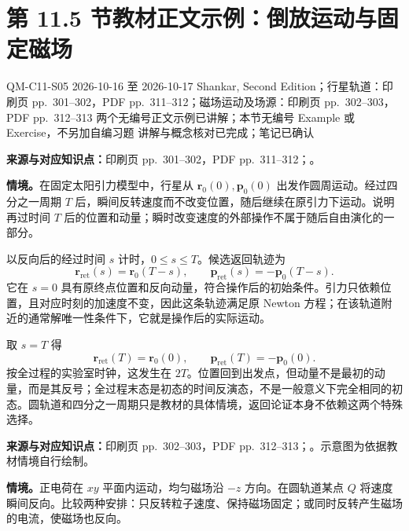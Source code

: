 \section{第 11.5 节教材正文示例：倒放运动与固定磁场}
\label{exercises:QM-C11-S05}
\exercisemeta
  {QM-C11-S05}
  {2026-10-16 至 2026-10-17}
  {Shankar, Second Edition；行星轨道：印刷页 pp.~301--302，PDF pp.~311--312；磁场运动及场源：印刷页 pp.~302--303，PDF pp.~312--313}
  {两个无编号正文示例已讲解；本节无编号 Example 或 Exercise，不另加自编习题}
  {讲解与概念核对已完成；笔记已确认}

\textbf{来源与对应知识点：}印刷页 pp.~301--302，PDF pp.~311--312；。

\textbf{情境。}在固定太阳引力模型中，行星从 $\mathbf r_0(0),\mathbf p_0(0)$ 出发作圆周运动。经过四分之一周期 $T$ 后，瞬间反转速度而不改变位置，随后继续在原引力下运动。说明再过时间 $T$ 后的位置和动量；瞬时改变速度的外部操作不属于随后自由演化的一部分。

\begin{checkedsolution}
以反向后的经过时间 $s$ 计时，$0\le s\le T$。候选返回轨迹为
\begin{equation}
  \mathbf r_{\mathrm{ret}}(s)=\mathbf r_0(T-s),\qquad
  \mathbf p_{\mathrm{ret}}(s)=-\mathbf p_0(T-s).
\end{equation}
它在 $s=0$ 具有原终点位置和反向动量，符合操作后的初始条件。引力只依赖位置，且对应时刻的加速度不变，因此这条轨迹满足原 Newton 方程；在该轨道附近的通常解唯一性条件下，它就是操作后的实际运动。

取 $s=T$ 得
\begin{equation}
  \boxed{\mathbf r_{\mathrm{ret}}(T)=\mathbf r_0(0),\qquad
         \mathbf p_{\mathrm{ret}}(T)=-\mathbf p_0(0)}.
\end{equation}
按全过程的实验室时钟，这发生在 $2T$。位置回到出发点，但动量不是最初的动量，而是其反号；全过程末态是初态的时间反演态，不是一般意义下完全相同的初态。圆轨道和四分之一周期只是教材的具体情境，返回论证本身不依赖这两个特殊选择。
\end{checkedsolution}

\textbf{来源与对应知识点：}印刷页 pp.~302--303，PDF pp.~312--313；。示意图为依据教材情境自行绘制。

\textbf{情境。}正电荷在 $xy$ 平面内运动，均匀磁场沿 $-z$ 方向。在圆轨道某点 $Q$ 将速度瞬间反向。比较两种安排：只反转粒子速度、保持磁场固定；或同时反转产生磁场的电流，使磁场也反向。


